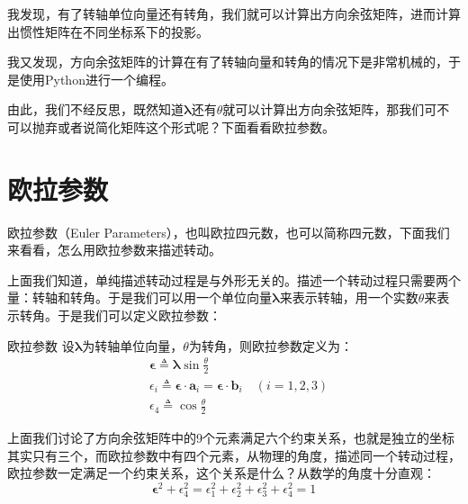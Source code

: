 我发现，有了转轴单位向量还有转角，我们就可以计算出方向余弦矩阵，进而计算出惯性矩阵在不同坐标系下的投影。

    我又发现，方向余弦矩阵的计算在有了转轴向量和转角的情况下是非常机械的，于是使用Python进行一个编程。

    由此，我们不经反思，既然知道$\boldsymbol{\lambda}$还有$\theta$就可以计算出方向余弦矩阵，那我们可不可以抛弃或者说简化矩阵这个形式呢？下面看看欧拉参数。
\newpage
\section{欧拉参数}
欧拉参数（Euler Parameters），也叫欧拉四元数，也可以简称四元数，下面我们来看看，怎么用欧拉参数来描述转动。

上面我们知道，单纯描述转动过程是与外形无关的。描述一个转动过程只需要两个量：转轴和转角。于是我们可以用一个单位向量$\boldsymbol{\lambda}$来表示转轴，用一个实数$\theta$来表示转角。于是我们可以定义欧拉参数：
\begin{mydefinition}{欧拉参数}
    设$\boldsymbol{\lambda}$为转轴单位向量，$\theta$为转角，则欧拉参数定义为：
    \begin{equation}
        \begin{aligned}
            &\boldsymbol{\epsilon} \triangleq \boldsymbol{\lambda}\sin \frac{\theta}{2}\\
            &\epsilon_i \triangleq \boldsymbol{\epsilon} \cdot \boldsymbol{a}_i=\boldsymbol{\epsilon} \cdot \boldsymbol{b}_i\quad(i=1,2,3)\\
            &\epsilon_4 \triangleq \cos \frac{\theta}{2}
        \end{aligned}
    \end{equation}

\end{mydefinition}



上面我们讨论了方向余弦矩阵中的9个元素满足六个约束关系，也就是独立的坐标其实只有三个，而欧拉参数中有四个元素，从物理的角度，描述同一个转动过程，欧拉参数一定满足一个约束关系，这个关系是什么？从数学的角度十分直观：
\begin{equation}\label{eq:欧拉参数归一化}
    \boldsymbol{\epsilon}^2+\epsilon_4^2=\epsilon_1^2+\epsilon_2^2+\epsilon_3^2+\epsilon_4^2=1
\end{equation}

